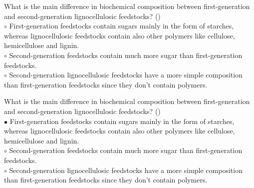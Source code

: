 \documentclass[]{beamer}
\begin{document}
\begin{CJK}{UTF8}{gbsn}
\begin{frame}[shrink] {}
\addtocounter{questions}{1}
\color{blue}
What is the main difference in biochemical composition between first-generation and second-generation lignocellulosic feedstocks?
({})\\
\color{black}
\setlength{\parindent}{-0.4cm}
{\color{red}$\circ$}  First-generation feedstocks contain sugars mainly in the form of starches, whereas lignocellulosic feedstocks contain also other polymers like cellulose, hemicellulose and lignin.   \\
{\color{red}$\circ$} Second-generation feedstocks contain much more sugar than first-generation feedstocks.   \\
{\color{red}$\circ$} Second-generation lignocellulosic feedstocks have a more simple composition than first-generation feedstocks since they don't contain polymers.   \\
\end{frame}
\begin{frame}[shrink] {}
\addtocounter{answers}{1}
\color{blue}
What is the main difference in biochemical composition between first-generation and second-generation lignocellulosic feedstocks?
({})\\
\color{black}
\setlength{\parindent}{-0.4cm}
{\color{red}$\bullet$} First-generation feedstocks contain sugars mainly in the form of starches, whereas lignocellulosic feedstocks contain also other polymers like cellulose, hemicellulose and lignin.   \\
{\color{red}$\circ$} Second-generation feedstocks contain much more sugar than first-generation feedstocks.   \\
{\color{red}$\circ$} Second-generation lignocellulosic feedstocks have a more simple composition than first-generation feedstocks since they don't contain polymers.   \\
\end{frame}



\end{CJK}
\end{document}

